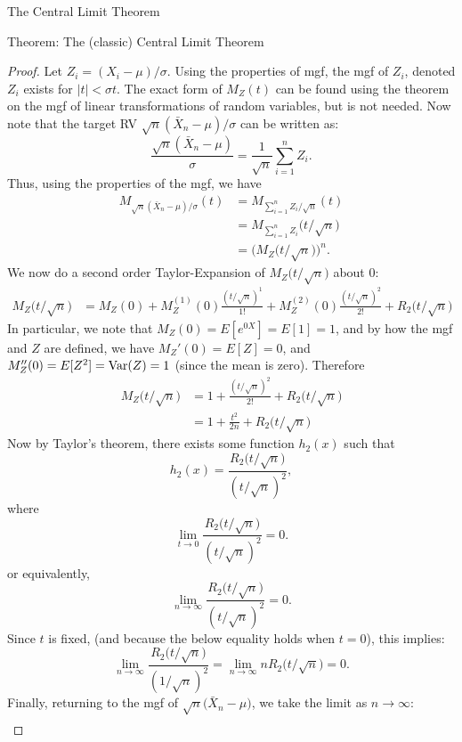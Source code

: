 \begin{frame}[allowframebreaks]{The Central Limit Theorem}
\begin{block}{Theorem: The (classic) Central Limit Theorem}
{\begin{proof}
      Let $Z_i = (X_i - \mu) / \sigma$. Using the properties of mgf, the mgf of $Z_i$, denoted $Z_i$ exists for $|t| < \sigma t$. The exact form of $M_Z(t)$ can be found using the theorem on the mgf of linear transformations of random variables, but is not needed. 
      Now note that the target RV $\sqrt{n}(\bar{X}_n - \mu) / \sigma$ can be written as:
      $$
      \frac{\sqrt{n}(\bar{X}_n - \mu)}{\sigma} = \frac{1}{\sqrt{n}}\sum_{i = 1}^n Z_i.
      $$
      Thus, using the properties of the mgf, we have
      \begin{align*}
        M_{\sqrt{n}(\bar{X}_n - \mu) / \sigma}(t) &= M_{\sum_{i = 1}^n Z_i / \sqrt{n}}(t) \\
        &= M_{\sum_{i = 1}^n Z_i}\big(t/\sqrt{n}\big) \\
        &= \Big(M_{Z}\big(t/\sqrt{n}\big)\Big)^n.
      \end{align*}
      We now do a second order Taylor-Expansion of $M_Z\big(t/\sqrt{n}\big)$ about $0$:
      \begin{align*}
      M_Z\big(t/\sqrt{n}\big) &= M_Z(0) + M^{(1)}_Z(0)\frac{(t /\sqrt{n})^1}{1!} + M^{(2)}_Z(0)\frac{(t /\sqrt{n})^2}{2!} + R_2\big(t/\sqrt{n}\big)
      \end{align*}
      In particular, we note that $M_Z(0) = E[e^{0X}] = E[1] = 1$, and by how the mgf and $Z$ are defined, we have $M_Z'(0) = E[Z] = 0$, and $M_Z''(0) = E[Z^2] = \mathrm{Var}(Z) = 1$ (since the mean is zero). Therefore
      \begin{align*}
      M_Z\big(t/\sqrt{n}\big) &= 1 + \frac{(t/\sqrt{n})^2}{2!} + R_2\big(t/\sqrt{n}\big) \\
      &= 1 + \frac{t^2}{2n} + R_2\big(t/\sqrt{n}\big)
      \end{align*}
      Now by Taylor's theorem, there exists some function $h_2(x)$ such that
      $$
      h_2(x) = \frac{R_2\big(t/\sqrt{n}\big)}{(t/\sqrt{n})^2},
      $$
      where
      $$
      \lim_{t\rightarrow 0} \frac{R_2\big(t/\sqrt{n}\big)}{(t/\sqrt{n})^2} = 0.
      $$
      or equivalently,
      $$
      \lim_{n\rightarrow\infty} \frac{R_2\big(t/\sqrt{n}\big)}{(t/\sqrt{n})^2} = 0.
      $$
      Since $t$ is fixed, (and because the below equality holds when $t=0$), this implies:
      $$
      \lim_{n \rightarrow \infty} \frac{R_2\big(t/\sqrt{n}\big)}{(1/\sqrt{n})^2} = \lim_{n\rightarrow \infty} nR_2\big(t/\sqrt{n}\big) = 0.
      $$
      Finally, returning to the mgf of $\sqrt{n}\big(\bar{X}_n - \mu\big)$, we take the limit as $n \rightarrow \infty$:
      \begin{align*}

\end{align*}
\end{proof}}
\end{block}
\end{frame}

